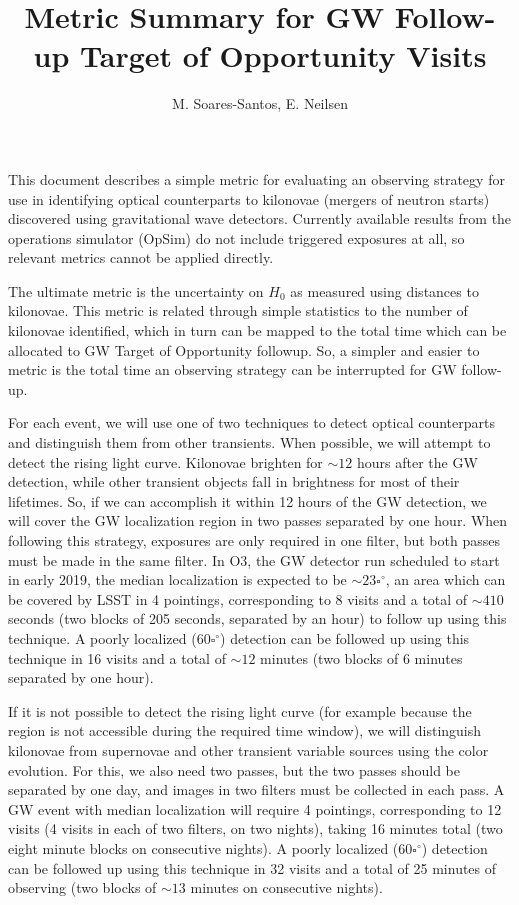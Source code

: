 \documentclass[a4paper,10pt]{article}
\title{Metric Summary for GW Follow-up Target of Opportunity Visits}
\author{M. Soares-Santos, E. Neilsen}
\date{}
\newcommand{\degree}{\ensuremath{^{\circ}}}
\begin{document}
\maketitle
This document describes a simple metric for evaluating an observing strategy for use in identifying optical counterparts to kilonovae (mergers of neutron starts) discovered using gravitational wave detectors. Currently available results from the operations simulator (OpSim) do not include triggered exposures at all, so relevant metrics cannot be applied directly.

The ultimate metric is the uncertainty on $H_0$ as measured using distances to kilonovae. This metric is related through simple statistics to the number of kilonovae identified, which in turn can be mapped to the total time which can be allocated to GW Target of Opportunity followup. So, a simpler and easier to metric is the total time an observing strategy can be interrupted for GW follow-up.

For each event, we will use one of two techniques to detect optical counterparts and distinguish them from other transients. When possible, we will attempt to detect the rising light curve. Kilonovae brighten for $\sim12$ hours after the GW detection, while other transient objects fall in brightness for most of their lifetimes. So, if we can accomplish it within 12 hours of the GW detection, we will cover the GW localization region in two passes separated by one hour. When following this strategy, exposures are only required in one filter, but both passes must be made in the same filter. In O3, the GW detector run scheduled to start in early 2019, the median localization is expected to be $\sim 23 \square\degree$, an area which can be covered by LSST in 4 pointings, corresponding to 8 visits and a total of $\sim 410$ seconds (two blocks of 205 seconds, separated by an hour) to follow up using this technique. A poorly localized ($60 \square \degree$) detection can be followed up using this technique in 16 visits and a total of $\sim 12$ minutes (two blocks of 6 minutes separated by one hour).

If it is not possible to detect the rising light curve (for example because the region is not accessible during the required time window), we will distinguish kilonovae from supernovae and other transient variable sources using the color evolution. For this, we also need two passes, but the two passes should be separated by one day, and images in two filters must be collected in each pass. A GW event with median localization will require 4 pointings, corresponding to 12 visits (4 visits in each of two filters, on two nights), taking 16 minutes total (two eight minute blocks on consecutive nights). A poorly localized ($60 \square \degree$) detection can be followed up using this technique in 32 visits and a total of 25 minutes of observing (two blocks of $\sim 13$ minutes on consecutive nights).
\end{document}
